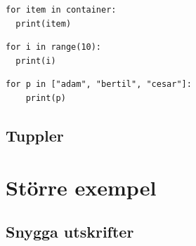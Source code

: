 \begin{frame}[fragile]
  \begin{lstlisting}[basicstyle=\huge,numbers=none]
for item in container:
  print(item)
  \end{lstlisting}
\end{frame}

\begin{frame}[fragile]
  \begin{example}
    \begin{lstlisting}
for i in range(10):
  print(i)
    \end{lstlisting}
  \end{example}
\end{frame}

\begin{frame}[fragile]
  \begin{example}
    \begin{lstlisting}
for p in ["adam", "bertil", "cesar"]:
    print(p)
    \end{lstlisting}
  \end{example}
\end{frame}

\begin{frame}[fragile]
  \begin{example}
    
  \end{example}
\end{frame}



\subsection{Tuppler}

\begin{frame}[fragile]
  \begin{example}[tuples.py]
    
  \end{example}
\end{frame}


\section{Större exempel}

\subsection{Snygga utskrifter}

